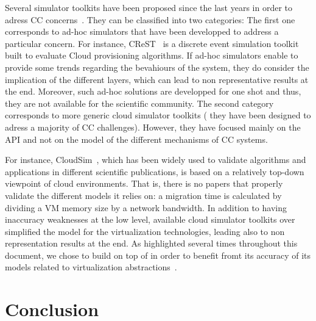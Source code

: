Several simulator toolkits have been proposed since the last years in
order to adress CC concerns~\cite{CC13, DGSIM, cloudsim, icancloud,
  greencloud}.  They can be classified into two categories: The first
one corresponds to ad-hoc simulators that have been developped to
address a particular concern. For instance, CReST~\cite{CC13} is a
discrete event simulation toolkit built to evaluate Cloud provisioning
algorithms. If ad-hoc simulators enable to provide some trends
regarding the bevahiours of the system, they do consider the
implication of the different layers, which can lead to non
representative results at the end. Moreover, such ad-hoc solutions are
developped for one shot and thus, they are not available for the
scientific community. The second category \cite{icancloud, greencloud,
  cloudsim} corresponds to more generic cloud simulator toolkits (\ie
they have been designed to adress a majority of CC
challenges). However, they have focused mainly on the API and not on
the model of the different mechanisms of CC systems.

For instance, CloudSim~\cite{cloudsim}, which has been widely used to
validate algorithms and applications in different scientific
publications, is based on a relatively top-down viewpoint of cloud
environments.  That is, there is no papers that properly validate the
different models it relies on: a migration time is calculated by
dividing a VM memory size by a network bandwidth.
 In addition to having inaccuracy weaknesses at the low level, available cloud
simulator toolkits over simplified the model for the virtualization
technologies, leading also to non representation results at the
end. As highlighted several times throughout this document, we chose to
build \vmps on top of \sg in order to benefit fromt its accuracy of
its models related to virtualization abstractions~\cite{Hirofuchi:2013:ALM:2568486.2568524}.

\section{Conclusion}
\label{sec:conclusion}

